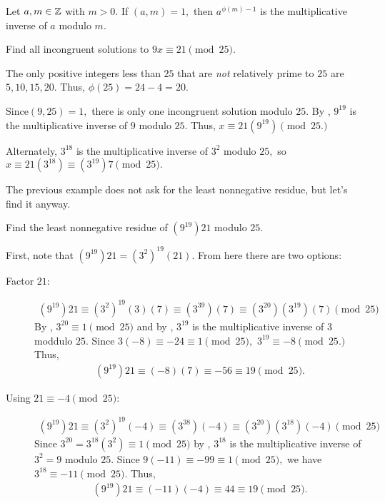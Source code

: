 \documentclass{../ximera}
\begin{document}
\begin{cor*}[Corollary 2.19]\label{cor:inv-euler}
 Let $a,m\in\mathbb Z$ with $m>0.$  If $(a,m)=1,$ then $a^{\phi(m)-1}$ is the multiplicative inverse of $a$ modulo $m$.
\end{cor*}

\begin{example}
 Find all incongruent solutions to $9x\equiv 21\pmod{25}$.
 
The only positive integers less than $25$ that are \emph{not} relatively prime to $25$ are $5,10,15,20$. Thus, $\phi(25)=24-4=20.$

Since$(9,25)=1,$ there is only one  incongruent solution  modulo $25.$ By , $9^{19}$ is the multiplicative inverse of $9$ modulo ${25}$. Thus, $x\equiv 21(9^{19})\pmod{25.}$

Alternately, $3^{18}$ is the multiplicative inverse of $3^2$ modulo ${25},$ so $x\equiv 21(3^{18})\equiv  (3^{19})7\pmod{25}.$
\end{example}

The previous example does not ask for the least nonnegative residue, but let's find it anyway.

\begin{example}
  Find the least nonnegative residue of $(9^{19})21$ modulo $25$.

  First, note that $(9^{19})21=(3^2)^19(21)$. From here there are two options:

  \begin{description}
    \item[Factor $21$:]
      \begin{align*}
        (9^{19})21\equiv (3^2)^19(3)(7)
        \equiv (3^{39})(7)
        \equiv (3^{20})(3^{19})(7) \pmod{25}
      \end{align*}
      By , $3^{20}\equiv 1\pmod{25}$ and by , $3^{19}$ is the multiplicative inverse of $3$ moddulo $25.$ Since $3(-8)\equiv -24\equiv 1\pmod{25},$ $3^{19}\equiv -8\pmod{25.}$ Thus, 
      \begin{align*}
        (9^{19})21\equiv (-8)(7)\equiv -56\equiv 19 \pmod{25}.
      \end{align*}

    \item[Using $21\equiv -4\pmod{25}$:] 
      \begin{align*}
        (9^{19})21\equiv (3^2)^19(-4)
        \equiv (3^{38})(-4)
        \equiv (3^{20})(3^{18})(-4) \pmod{25}
      \end{align*}
      Since $3^{20}=3^{18}(3^2)\equiv 1\pmod{25}$ by , $3^{18}$ is the multiplicative inverse of $3^2=9$ modulo $25.$ Since $9(-11)\equiv -99\equiv 1\pmod{25},$ we have $3^{18}\equiv -11\pmod{25}.$ Thus, 
      \begin{align*}
        (9^{19})21\equiv (-11)(-4)\equiv 44 \equiv 19 \pmod{25}.
      \end{align*}
  \end{description}
  
\end{example}
\end{document}
